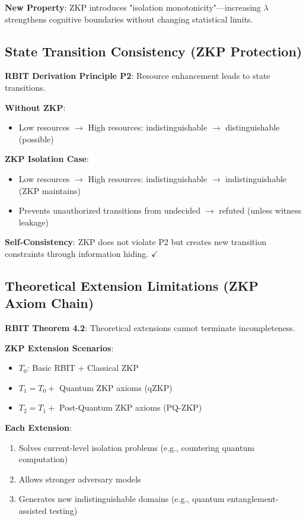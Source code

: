 \documentclass[12pt]{article}
\theoremstyle{plain}
\theoremstyle{definition}
\begin{document}
\textbf{New Property}: ZKP introduces "isolation monotonicity"—increasing $\lambda$ strengthens cognitive boundaries without changing statistical limits.

\subsection{State Transition Consistency (ZKP Protection)}

\textbf{RBIT Derivation Principle P2}: Resource enhancement leads to state transitions.

\textbf{Without ZKP}:
\begin{itemize}
\item Low resources $\to$ High resources: indistinguishable $\to$ distinguishable (possible)
\end{itemize}

\textbf{ZKP Isolation Case}:
\begin{itemize}
\item Low resources $\to$ High resources: indistinguishable $\to$ indistinguishable (ZKP maintains)
\item Prevents unauthorized transitions from undecided $\to$ refuted (unless witness leakage)
\end{itemize}

\textbf{Self-Consistency}: ZKP does not violate P2 but creates new transition constraints through information hiding. $\checkmark$

\subsection{Theoretical Extension Limitations (ZKP Axiom Chain)}

\textbf{RBIT Theorem 4.2}: Theoretical extensions cannot terminate incompleteness.

\textbf{ZKP Extension Scenarios}:
\begin{itemize}
\item $T_0$: Basic RBIT + Classical ZKP
\item $T_1 = T_0 +$ Quantum ZKP axioms (qZKP)
\item $T_2 = T_1 +$ Post-Quantum ZKP axioms (PQ-ZKP)
\end{itemize}

\textbf{Each Extension}:
\begin{enumerate}
\item Solves current-level isolation problems (e.g., countering quantum computation)
\item Allows stronger adversary models
\item Generates new indistinguishable domains (e.g., quantum entanglement-assisted testing)
\end{enumerate}
\end{document}
